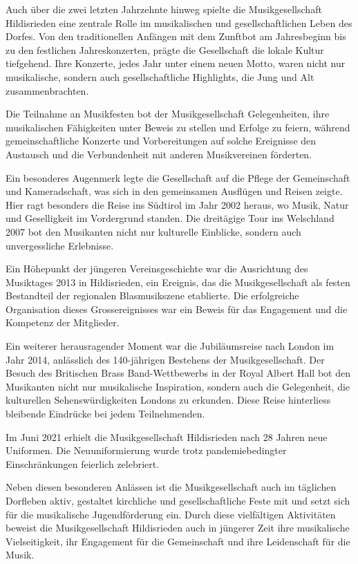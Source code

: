 \begin{history}

    Auch über die zwei letzten Jahrzehnte hinweg spielte die Musikgesellschaft
    Hildisrieden eine zentrale Rolle im musikalischen und gesellschaftlichen
    Leben des Dorfes. Von den traditionellen Anfängen mit dem Zunftbot am
    Jahresbeginn bis zu den festlichen Jahreskonzerten, prägte die Gesellschaft
    die lokale Kultur tiefgehend. Ihre Konzerte, jedes Jahr unter einem neuen
    Motto, waren nicht nur musikalische, sondern auch gesellschaftliche
    Highlights, die Jung und Alt zusammenbrachten.

    Die Teilnahme an Musikfesten bot der Musikgesellschaft Gelegenheiten, ihre
    musikalischen Fähigkeiten unter Beweis zu stellen und Erfolge zu feiern,
    während gemeinschaftliche Konzerte und Vorbereitungen auf solche Ereignisse
    den Austausch und die Verbundenheit mit anderen Musikvereinen förderten.

    Ein besonderes Augenmerk legte die Gesellschaft auf die Pflege der
    Gemeinschaft und Kameradschaft, was sich in den gemeinsamen Ausflügen und
    Reisen zeigte. Hier ragt besonders die Reise ins Südtirol im Jahr 2002
    heraus, wo Musik, Natur und Geselligkeit im Vordergrund standen. Die
    dreitägige Tour ins Welschland 2007 bot den Musikanten nicht nur kulturelle
    Einblicke, sondern auch unvergessliche Erlebnisse.

    Ein Höhepunkt der jüngeren Vereinsgeschichte war die Ausrichtung des
    Musiktages 2013 in Hildisrieden, ein Ereignis, das die Musikgesellschaft als
    festen Bestandteil der regionalen Blasmusikszene etablierte. Die
    erfolgreiche Organisation dieses Grossereignisses war ein Beweis für das
    Engagement und die Kompetenz der Mitglieder.

    Ein weiterer herausragender Moment war die Jubiläumsreise nach London im
    Jahr 2014, anlässlich des 140-jährigen Bestehens der Musikgesellschaft. Der
    Besuch des Britischen Brass Band-Wettbewerbs in der Royal Albert Hall bot
    den Musikanten nicht nur musikalische Inspiration, sondern auch die
    Gelegenheit, die kulturellen Sehenswürdigkeiten Londons zu erkunden. Diese
    Reise hinterliess bleibende Eindrücke bei jedem Teilnehmenden.

    Im Juni 2021 erhielt die Musikgesellschaft Hildisrieden nach 28 Jahren neue
    Uniformen. Die Neuuniformierung wurde trotz pandemiebedingter
    Einschränkungen feierlich zelebriert.

    Neben diesen besonderen Anlässen ist die Musikgesellschaft auch im täglichen
    Dorfleben aktiv, gestaltet kirchliche und gesellschaftliche Feste mit und
    setzt sich für die musikalische Jugendförderung ein. Durch diese
    vielfältigen Aktivitäten beweist die Musikgesellschaft Hildisrieden auch in
    jüngerer Zeit ihre musikalische Vielseitigkeit, ihr Engagement für die
    Gemeinschaft und ihre Leidenschaft für die Musik.


\end{history}
